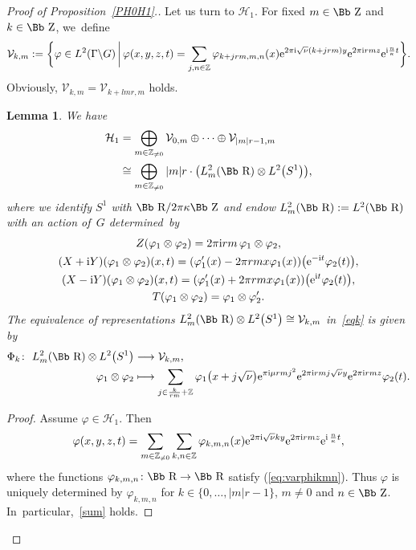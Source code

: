 \documentclass[pdftex]{sigma}
\newcommand\RR{{\mbox{\Bb R}}}
\newcommand\ZZ{{\mbox{\Bb Z}}}
\newcommand\Z{{\mathbb Z}}
\newcommand\cV{{\mathcal V}}
\newcommand\cH{{\mathcal H}}
\newcommand\ph{\varphi}
\numberwithin{equation}{section}
\newtheorem{Lemma}[Theorem]{Lemma}
\begin{document}
\begin{proof}[Proof of Proposition~\ref{PH0H1}.]
Let us turn to $\cH_1$. For fixed $m\in\ZZ$ and $k\in\ZZ$, we~define
\begin{gather*}
{\mathcal V}_{k,m}:=\bigg\{ \ph\in L^2(\Gamma\backslash G)\,\bigg| \, \varphi(x,y,z,t)=\sum_{j,n\in\Z}\varphi_{k+jrm,m,n}(x){\rm e}^{2\pi {\rm i}\sqrt\nu (k+jrm)y}{\rm e}^{2\pi {\rm i}rmz}{\rm e}^{{\rm i} \frac{n}{\kappa}t}\bigg\}.
\end{gather*}
Obviously, ${\mathcal V}_{k,m}={\mathcal V}_{k+lmr,m}$ holds.
\begin{Lemma} \label{LL1m} We have
\begin{align}
\cH_1&=\bigoplus_{m\in \Z_{\not=0}} \cV_{0,m}\oplus\dots\oplus\cV_{|m|r-1,m}\label{sum}
\\
&\cong\bigoplus_{m\in \Z_{\not=0}} |m|r\cdot \big( L^2_{m}(\RR)\otimes L^2\big(S^1\big)\big), \label{eqk}
\end{align}
where we identify $S^1$ with $\RR/2\pi\kappa \ZZ$ and endow $L^2_{m}(\RR):=L^2(\RR)$ with an action of~$G$ determi\-ned~by
\begin{gather}
Z(\ph_1\otimes\ph_2)=2\pi {\rm i} rm\,\ph_1\otimes\ph_2, \label{EmZ}
\\
(X+{\rm i}Y)(\ph_1\otimes\ph_2)(x,t)= ( \ph_1'(x)-2\pi rm x \ph_1(x)) \big({\rm e}^{-{\rm i}t} \ph_2(t)\big), \label{Em+}
\\
(X-{\rm i}Y)(\ph_1\otimes\ph_2)(x,t)= ( \ph_1'(x)+2\pi rm x \ph_1(x)) \big({\rm e}^{{\rm i}t} \ph_2(t)\big),\label{Em-}
\\
T(\ph_1\otimes\ph_2)=\ph_1\otimes \ph_2'.\label{EmT}
\end{gather}
The equivalence of representations $L^2_{m}(\RR)\otimes L^2\big(S^1\big) \cong {\mathcal V}_{k,m}$ in~\eqref{eqk} is given by
\begin{align*}
\Phi_k\colon\ L^2_{m}(\RR)\otimes L^2\big(S^1\big) &\longrightarrow{\mathcal V}_{k,m},
\\
\ph_1\otimes\ph_2&\longmapsto \sum_{j\in \frac k{rm}+\Z}
\varphi_1\big(x+j\sqrt\nu\big){\rm e}^{\pi {\rm i}\mu rmj^2}{\rm e}^{2\pi {\rm i}rmj\sqrt\nu y}{\rm e}^{2\pi {\rm i}rmz}\ph_2(t).
\end{align*}
\end{Lemma}

\begin{proof}
Assume $\varphi\in \cH_1$. Then
\begin{gather*}
\varphi(x,y,z,t)=\sum_{m\in\Z_{\not=0}}\sum_{k,n\in\Z}\varphi_{k,m,n}(x){\rm e}^{2\pi {\rm i}\sqrt\nu ky}{\rm e}^{2\pi {\rm i}rmz}{\rm e}^{{\rm i}\,\frac{n}{\kappa}t},
\end{gather*}
where the functions $\varphi_{k,m,n}\colon \RR\rightarrow\RR$ satisfy (\ref{eq:varphikmn}). Thus $\varphi$ is uniquely determined by
$\varphi_{k,m,n}$ for $k\in\{0,\dots,|m|r-1\}$, $m\neq 0$ and $n\in\ZZ$. In~particular,~\eqref{sum} holds.



\end{proof}
\end{proof}
\end{document}
